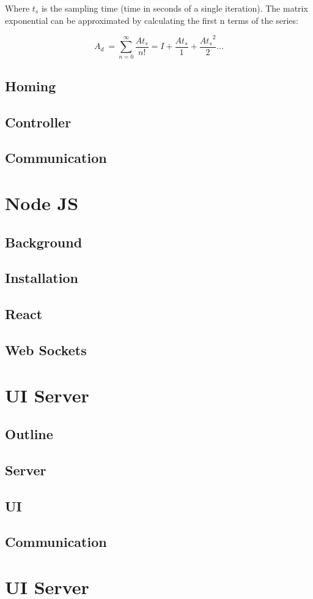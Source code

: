\documentclass{article}
\begin{document}
	Where $t_s$ is the sampling time (time in seconds of a single iteration). The matrix exponential can be approximated by calculating the first n terms of the series:
	
	\begin{equation}
	A_d ~= \sum_{n=0}^{\infty} \frac{At_s}{n!} = I + \frac{At_s}{1} + \frac{{At_s}^2}{2} ... 
	\end{equation}
	
	\subsection{Homing}
	
	
	\subsection{Controller}
	
	
	\subsection{Communication}

\section{Node JS}
	\subsection{Background}
	\subsection{Installation}
	\subsection{React}
	\subsection{Web Sockets}
	
\section{UI Server}
	\subsection{Outline}
	\subsection{Server}
	\subsection{UI} 
	\subsection{Communication}
	
		
\section{UI Server}
\end{document}
